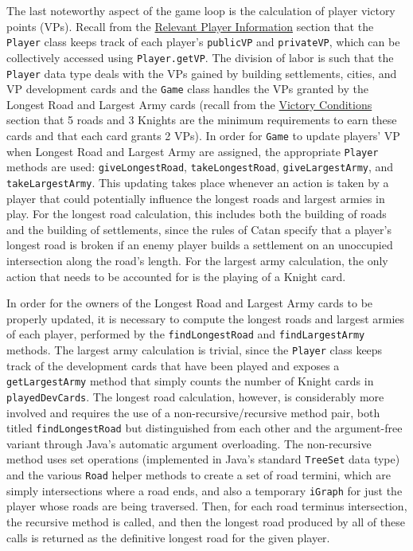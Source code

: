 \documentclass[pageno]{jpaper}
\begin{document}
\begin{doublespacing}
The last noteworthy aspect of the game loop is the calculation of player victory points (VPs). Recall from the \hyperlink{sec:relevant_player_information}{Relevant Player Information} section that the \lstinline$Player$ class keeps track of each player's \lstinline$publicVP$ and \lstinline$privateVP$, which can be collectively accessed using \lstinline$Player.getVP$. The division of labor is such that the \lstinline$Player$ data type deals with the VPs gained by building settlements, cities, and VP development cards and the \lstinline$Game$ class handles the VPs granted by the Longest Road and Largest Army cards (recall from the \hyperlink{sec:victory_conditions}{Victory Conditions} section that 5 roads and 3 Knights are the minimum requirements to earn these cards and that each card grants 2 VPs). In order for \lstinline$Game$ to update players' VP when Longest Road and Largest Army are assigned, the appropriate \lstinline$Player$ methods are used: \lstinline$giveLongestRoad$, \lstinline$takeLongestRoad$, \lstinline$giveLargestArmy$, and \lstinline$takeLargestArmy$. This updating takes place whenever an action is taken by a player that could potentially influence the longest roads and largest armies in play. For the longest road calculation, this includes both the building of roads and the building of settlements, since the rules of Catan specify that a player's longest road is broken if an enemy player builds a settlement on an unoccupied intersection along the road's length. For the largest army calculation, the only action that needs to be accounted for is the playing of a Knight card.

In order for the owners of the Longest Road and Largest Army cards to be properly updated, it is necessary to compute the longest roads and largest armies of each player, performed by the \lstinline$findLongestRoad$ and \lstinline$findLargestArmy$ methods. The largest army calculation is trivial, since the \lstinline$Player$ class keeps track of the development cards that have been played and exposes a \lstinline$getLargestArmy$ method that simply counts the number of Knight cards in \lstinline$playedDevCards$. The longest road calculation, however, is considerably more involved and requires the use of a non-recursive/recursive method pair, both titled \lstinline$findLongestRoad$ but distinguished from each other and the argument-free variant through Java's automatic argument overloading. The non-recursive method uses set operations (implemented in Java's standard \lstinline$TreeSet$ data type) and the various \lstinline$Road$ helper methods to create a set of road termini, which are simply intersections where a road ends, and also a temporary \lstinline$iGraph$ for just the player whose roads are being traversed. Then, for each road terminus intersection, the recursive method is called, and then the longest road produced by all of these calls is returned as the definitive longest road for the given player.


\end{doublespacing}
\end{document}
